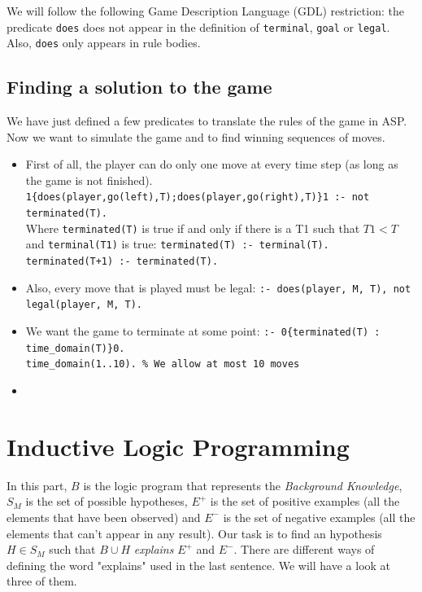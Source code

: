 We will follow the following Game Description Language (GDL) restriction: the predicate \texttt{does} does not appear in the definition of \texttt{terminal}, \texttt{goal} or \texttt{legal}. Also, \texttt{does} only appears in rule bodies. 

\subsection{Finding a solution to the game}

We have just defined a few predicates to translate the rules of the game in ASP. Now we want to simulate the game and to find winning sequences of moves.
\begin{itemize}
\item First of all, the player can do only one move at every time step (as long as the game is not finished).\newline
\texttt{1\{does(player,go(left),T);does(player,go(right),T)\}1 :- not terminated(T).}\\
Where \texttt{terminated(T)} is true if and only if there is a T1 such that $T1<T$ and \texttt{terminal(T1)} is true:\newline
\texttt{terminated(T) :- terminal(T).}  \\
\texttt{terminated(T+1) :- terminated(T).}

\item Also, every move that is played must be legal:\newline
\texttt{:- does(player, M, T), not legal(player, M, T).}

\item We want the game to terminate at some point:\newline
\texttt{:- 0\{terminated(T) : time\_domain(T)\}0.}\\
\texttt{time\_domain(1..10). \% We allow at most 10 moves} 

\item 

\end{itemize}



\section{Inductive Logic Programming}

In this part, $B$ is the logic program that represents the \textit{Background Knowledge}, $S_M$ is the set of possible hypotheses, $E^+$ is the set of positive examples (all the elements that have been observed) and $E^-$ is the set of negative examples (all the elements that can't appear in any result). Our task is to find an hypothesis $H\in S_M$ such that $B\cup H$ \textit{explains} $E^+$ and $E^-$. There are different ways of defining the word "explains" used in the last sentence. We will have a look at three of them.

